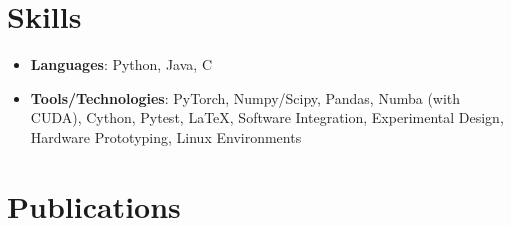 \documentclass[letterpaper,11pt]{article}
\newcommand{\resumeItem}[2]{
  \item\small{
    \textbf{#1}{: #2 \vspace{-1.0pt}}
  }
}
\newcommand{\resumeItemListStart}{\begin{itemize}}
\newcommand{\resumeItemListEnd}{\end{itemize}\vspace{-5pt}}
\newenvironment{resumeItemList}{\resumeItemListStart}{\resumeItemListEnd}
\begin{document}
\section{Skills}
  \begin{resumeItemList}
    \resumeItem{Languages}{Python, Java, C}
    \resumeItem{Tools/Technologies}{PyTorch, Numpy/Scipy, Pandas, Numba (with CUDA), Cython, Pytest, \LaTeX,
                                    Software Integration, Experimental Design, Hardware Prototyping, Linux Environments} %
  \end{resumeItemList}

\section{Publications}
\nocite{*}


\end{document}
